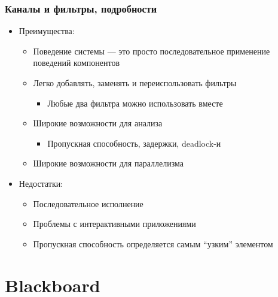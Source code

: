 \documentclass{../../slides-style}
\begin{document}
    \begin{frame}
        \frametitle{Каналы и фильтры, подробности}
        \begin{itemize}
            \item Преимущества:
            \begin{itemize}
                \item Поведение системы --- это просто последовательное применение поведений компонентов
                \item Легко добавлять, заменять и переиспользовать фильтры
                \begin{itemize}
                    \item Любые два фильтра можно использовать вместе
                \end{itemize}
                \item Широкие возможности для анализа
                \begin{itemize}
                    \item Пропускная способность, задержки, deadlock-и
                \end{itemize}
                \item Широкие возможности для параллелизма
            \end{itemize}
            \item Недостатки:
            \begin{itemize}
                \item Последовательное исполнение
                \item Проблемы с интерактивными приложениями
                \item Пропускная способность определяется самым ``узким'' элементом
            \end{itemize}
        \end{itemize}
    \end{frame}

    \section{Blackboard}
\end{document}
